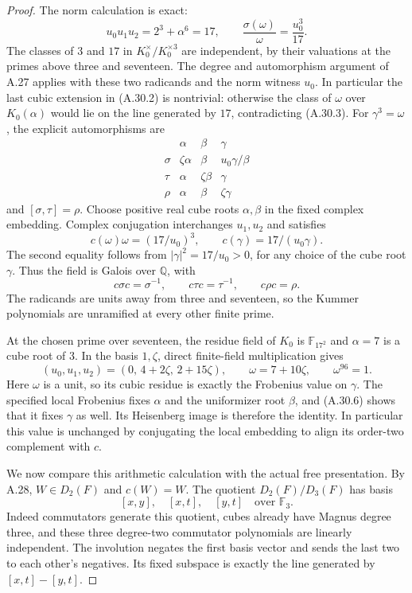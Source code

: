 \begin{proof}
The norm calculation is exact:
\[
 u_0u_1u_2=2^3+\alpha^6=17,
 \qquad
 \frac{\sigma(\omega)}{\omega}
          =\frac{u_0^3}{17}.
 \tag{A.30.3}
\]
The classes of $3$ and $17$ in
$K_0^\times/K_0^{\times3}$ are
independent, by their valuations at
the primes above three and seventeen.
The degree and automorphism argument
of A.27 applies with these two
radicands and the norm witness
$u_0$. In particular the last
cubic extension in (A.30.2) is
nontrivial: otherwise the class
of $\omega$ over $K_0(\alpha)$
would lie on the line generated
by $17$, contradicting (A.30.3).
For $\gamma^3=\omega$, the explicit
automorphisms are
\[
\begin{array}{c|ccc}
 &\alpha&\beta&\gamma\\\hline
 \sigma&\zeta\alpha&\beta&u_0\gamma/\beta\\
 \tau&\alpha&\zeta\beta&\gamma\\
 \rho&\alpha&\beta&\zeta\gamma
\end{array}
 \tag{A.30.4}
\]
and $[\sigma,\tau]=\rho$.
Choose positive real cube roots
$\alpha,\beta$ in the fixed complex
embedding. Complex conjugation
interchanges $u_1,u_2$ and satisfies
\[
 c(\omega)\omega=(17/u_0)^3,
 \qquad c(\gamma)=17/(u_0\gamma).
\]
The second equality follows from
$|\gamma|^2=17/u_0>0$, for any
choice of the cube root $\gamma$.
Thus the field is Galois over
$\mathbb Q$, with
\[
 c\sigma c=\sigma^{-1},\qquad
 c\tau c=\tau^{-1},\qquad
 c\rho c=\rho.
 \tag{A.30.5}
\]
The radicands are units away from
three and seventeen, so the
Kummer polynomials are unramified
at every other finite prime.

At the chosen prime over
seventeen, the residue field of
$K_0$ is $\mathbb F_{17^2}$ and
$\alpha=7$ is a cube root of
$3$. In the basis $1,\zeta$,
direct finite-field multiplication
gives
\[
 (u_0,u_1,u_2)=(0,\,4+2\zeta,\,2+15\zeta),
 \qquad \omega=7+10\zeta,
 \qquad \omega^{96}=1.
 \tag{A.30.6}
\]
Here $\omega$ is a unit, so its
cubic residue is exactly the
Frobenius value on $\gamma$.
The specified local Frobenius
fixes $\alpha$ and the uniformizer
root $\beta$, and (A.30.6) shows
that it fixes $\gamma$ as well.
Its Heisenberg image is therefore
the identity. In particular this
value is unchanged by conjugating
the local embedding to align its
order-two complement with $c$.

We now compare this arithmetic
calculation with the actual free
presentation. By A.28, $W\in D_2(F)$
and $c(W)=W$. The quotient
$D_2(F)/D_3(F)$ has basis
\[
 [x,y],\quad[x,t],\quad[y,t]
 \quad\text{over }\mathbb F_3.
\]
Indeed commutators generate this
quotient, cubes already have
Magnus degree three, and these
three degree-two commutator
polynomials are linearly independent.
The involution negates the first
basis vector and sends the last
two to each other's negatives.
Its fixed subspace is exactly
the line generated by
$[x,t]-[y,t]$.


\end{proof}
